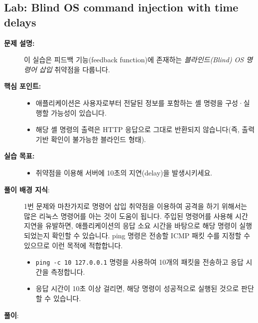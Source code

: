 \documentclass{article}
\begin{document}
\subsection*{Lab: Blind OS command injection with time delays}
\begin{description}
  \item[\textbf{문제 설명:}] 이 실습은 피드백 기능(feedback function)에 존재하는 \emph{블라인드(Blind) OS 명령어 삽입} 취약점을 다룹니다.

  \item[\textbf{핵심 포인트:}]\leavevmode\par
    \begin{itemize}
      \item 애플리케이션은 사용자로부터 전달된 정보를 포함하는 셸 명령을 구성·실행할 가능성이 있습니다.
      \item 해당 셸 명령의 출력은 HTTP 응답으로 그대로 반환되지 않습니다(즉, 출력 기반 확인이 불가능한 블라인드 형태).
    \end{itemize}

  \item[\textbf{실습 목표:}]\leavevmode\par
    \begin{itemize}
      \item 취약점을 이용해 서버에 10초의 지연(delay)을 발생시키세요.
    \end{itemize}

  \item[\textbf{풀이 배경 지식}:]\leavevmode\par
    1번 문제와 마찬가지로 명령어 삽입 취약점을 이용하여 공격을 하기 위해서는 많은 리눅스 명령어를 아는 것이 도움이 됩니다.
    주입된 명령어를 사용해 시간 지연을 유발하면, 애플리케이션의 응답 소요 시간을 바탕으로 해당 명령이 실행되었는지 확인할 수 있습니다. 
    ping 명령은 전송할 ICMP 패킷 수를 지정할 수 있으므로 이런 목적에 적합합니다. 

    \begin{itemize}
      \item \texttt{ping -c 10 127.0.0.1} 명령을 사용하여 10개의 패킷을 전송하고 응답 시간을 측정합니다.
      \item 응답 시간이 10초 이상 걸리면, 해당 명령이 성공적으로 실행된 것으로 판단할 수 있습니다.
    \end{itemize}

    \item[\textbf{풀이}:] \leavevmode\par


\end{description}
\end{document}
